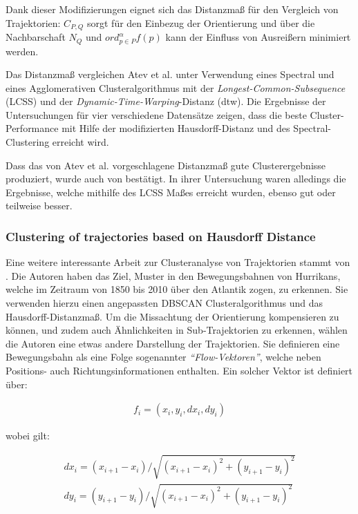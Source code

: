 Dank dieser Modifizierungen eignet sich das Distanzmaß für den Vergleich von Trajektorien:
$C_{P,Q}$ sorgt für den Einbezug der Orientierung und über die Nachbarschaft $N_Q$ und $ord_{p \in P}^{\alpha} f(p)$
kann der Einfluss von Ausreißern minimiert werden.

Das Distanzmaß vergleichen Atev et al. unter Verwendung eines Spectral und eines Agglomerativen
Clusteralgorithmus mit der \textit{Longest-Common-Subsequence} (LCSS) und der \textit{Dynamic-Time-Warping}-Distanz (\acrshort*{dtw}).
Die Ergebnisse der Untersuchungen für vier verschiedene Datensätze zeigen, dass die beste Cluster-Performance
mit Hilfe der modifizierten Hausdorff-Distanz und des Spectral-Clustering erreicht wird.

Dass das von Atev et al. vorgeschlagene Distanzmaß gute Clusterergebnisse produziert, wurde auch von \cite[]{Morris2009}
bestätigt. In ihrer Untersuchung waren alledings die Ergebnisse, welche mithilfe des LCSS Maßes erreicht wurden,
ebenso gut oder teilweise besser.

\subsubsection*{Clustering of trajectories based on Hausdorff Distance}
Eine weitere interessante Arbeit zur Clusteranalyse von Trajektorien stammt von \cite[]{Chen2011}.
Die Autoren haben das Ziel, Muster in den Bewegungsbahnen von Hurrikans, welche im Zeitraum von 1850 bis 2010
über den Atlantik zogen, zu erkennen.
Sie verwenden hierzu einen angepassten DBSCAN Clusteralgorithmus und das Hausdorff-Distanzmaß.
Um die Missachtung der Orientierung kompensieren zu können, und zudem auch Ähnlichkeiten
in Sub-Trajektorien zu erkennen, wählen die Autoren eine etwas andere Darstellung der Trajektorien.
Sie definieren eine Bewegungsbahn als eine Folge sogenannter \textit{``Flow-Vektoren''}, welche neben
Positions- auch Richtungsinformationen enthalten. Ein solcher Vektor ist definiert über:

\begin{ceqn}
\begin{align}
    f_i = (x_i, y_i, dx_i, dy_i)
\end{align}
\end{ceqn}

wobei gilt:

\begin{ceqn}
\begin{align}
    dx_i = (x_{i+1} - x_i)/\sqrt{(x_{i+1} - x_i)^2 + (y_{i+1} - y_i)^2} \\
    dy_i = (y_{i+1} - y_i)/\sqrt{(x_{i+1} - x_i)^2 + (y_{i+1} - y_i)^2}
\end{align}
\end{ceqn}

